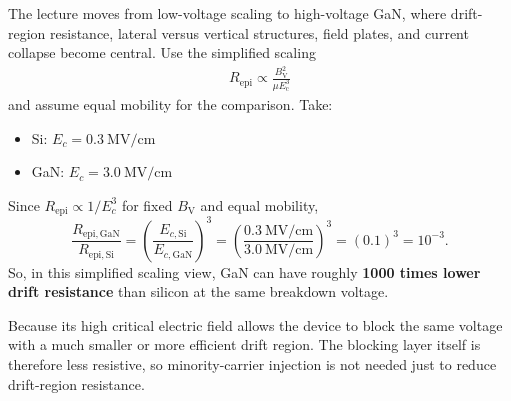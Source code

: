 

The lecture moves from low-voltage scaling to high-voltage GaN, where drift-region resistance, lateral versus vertical structures, field plates, and current collapse become central. Use the simplified scaling
    \begin{align*}
        R_{\mathrm{epi}} \propto \frac{B_\mathrm{V}^2}{\mu E_\mathrm{c}^3}
    \end{align*}
    and assume equal mobility for the comparison. Take:
    \begin{itemize}
        \setlength{\itemsep}{-2pt} %
        \setlength{\parskip}{-2pt} %
        \item Si: $E_c = \SI{0.3}{\mega\volt\per\centi\metre}$
        \item GaN: $E_c = \SI{3.0}{\mega\volt\per\centi\metre}$
    \end{itemize}

\begin{solutionblock}
    Since $R_{\mathrm{epi}} \propto 1/E_c^3$ for fixed $B_\mathrm{V}$ and equal mobility,
    \begin{equation}
        \frac{R_{\mathrm{epi,GaN}}}{R_{\mathrm{epi,Si}}}
        =
        \left(\frac{E_{c,\mathrm{Si}}}{E_{c,\mathrm{GaN}}}\right)^3
        =
        \left(\frac{\SI{0.3}{\mega\volt\per\centi\metre}}{\SI{3.0}{\mega\volt\per\centi\metre}}\right)^3
        =
        (0.1)^3
        =
        10^{-3}.
    \end{equation}
    So, in this simplified scaling view, GaN can have roughly \textbf{1000 times lower drift resistance} than silicon at the same breakdown voltage.
\end{solutionblock}

\begin{solutionblock}
    Because its high critical electric field allows the device to block the same voltage with a much smaller or more efficient drift region. The blocking layer itself is therefore less resistive, so minority-carrier injection is not needed just to reduce drift-region resistance.
\end{solutionblock}

